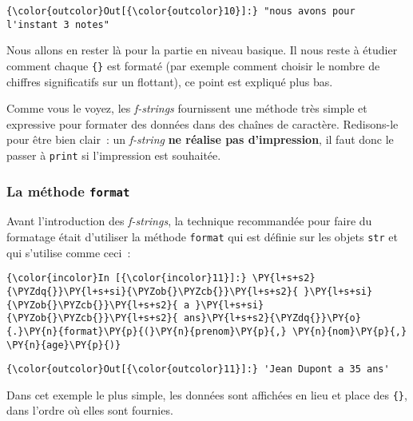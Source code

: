 \begin{Verbatim}[commandchars=\\\{\},frame=single,framerule=0.3mm,rulecolor=\color{cellframecolor}]
{\color{outcolor}Out[{\color{outcolor}10}]:} "nous avons pour l'instant 3 notes"
\end{Verbatim}
            
    Nous allons en rester là pour la partie en niveau basique. Il nous reste
à étudier comment chaque \texttt{\{\}} est formaté (par exemple comment
choisir le nombre de chiffres significatifs sur un flottant), ce point
est expliqué plus bas.

Comme vous le voyez, les \emph{f-strings} fournissent une méthode très
simple et expressive pour formater des données dans des chaînes de
caractère. Redisons-le pour être bien clair~: un \emph{f-string}
\textbf{ne réalise pas d'impression}, il faut donc le passer à
\texttt{print} si l'impression est souhaitée.

    \hypertarget{la-muxe9thode-format}{%
\subsubsection{\texorpdfstring{La méthode
\texttt{format}}{La méthode format}}\label{la-muxe9thode-format}}

    Avant l'introduction des \emph{f-strings}, la technique recommandée pour
faire du formatage était d'utiliser la méthode \texttt{format} qui est
définie sur les objets \texttt{str} et qui s'utilise comme ceci~:

    \begin{Verbatim}[commandchars=\\\{\},frame=single,framerule=0.3mm,rulecolor=\color{cellframecolor}]
{\color{incolor}In [{\color{incolor}11}]:} \PY{l+s+s2}{\PYZdq{}}\PY{l+s+si}{\PYZob{}\PYZcb{}}\PY{l+s+s2}{ }\PY{l+s+si}{\PYZob{}\PYZcb{}}\PY{l+s+s2}{ a }\PY{l+s+si}{\PYZob{}\PYZcb{}}\PY{l+s+s2}{ ans}\PY{l+s+s2}{\PYZdq{}}\PY{o}{.}\PY{n}{format}\PY{p}{(}\PY{n}{prenom}\PY{p}{,} \PY{n}{nom}\PY{p}{,} \PY{n}{age}\PY{p}{)}
\end{Verbatim}


\begin{Verbatim}[commandchars=\\\{\},frame=single,framerule=0.3mm,rulecolor=\color{cellframecolor}]
{\color{outcolor}Out[{\color{outcolor}11}]:} 'Jean Dupont a 35 ans'
\end{Verbatim}
            
    Dans cet exemple le plus simple, les données sont affichées en lieu et
place des \texttt{\{\}}, dans l'ordre où elles sont fournies.

